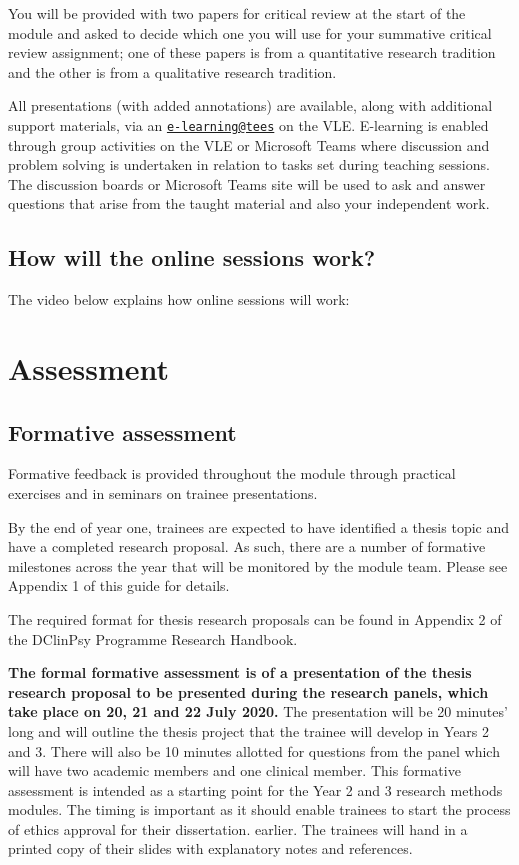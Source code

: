 \documentclass[
]{book}
\begin{document}
You will be provided with two papers for critical review at the start of the module and asked to decide which one you will use for your summative critical review assignment; one of these papers is from a quantitative research tradition and the other is from a qualitative research tradition.

All presentations (with added annotations) are available, along with additional support materials, via an \href{mailto:e-learning@tees}{\nolinkurl{e-learning@tees}} on the VLE. E-learning is enabled through group activities on the VLE or Microsoft Teams where discussion and problem solving is undertaken in relation to tasks set during teaching sessions. The discussion boards or Microsoft Teams site will be used to ask and answer questions that arise from the taught material and also your independent work.

\hypertarget{how-will-the-online-sessions-work}{%
\subsection{How will the online sessions work?}\label{how-will-the-online-sessions-work}}

The video below explains how online sessions will work:

\hypertarget{assessment}{%
\section{Assessment}\label{assessment}}

\hypertarget{formative-assessment}{%
\subsection{Formative assessment}\label{formative-assessment}}

Formative feedback is provided throughout the module through practical exercises and in seminars on trainee presentations.

By the end of year one, trainees are expected to have identified a thesis topic and have a completed research proposal. As such, there are a number of formative milestones across the year that will be monitored by the module team. Please see Appendix 1 of this guide for details.

The required format for thesis research proposals can be found in Appendix 2 of the DClinPsy
Programme Research Handbook.

\textbf{The formal formative assessment is of a presentation of the thesis research proposal to be presented during the research panels, which take place on 20, 21 and 22 July 2020.} The presentation will be 20 minutes' long and will outline the thesis project that the trainee will develop in Years 2 and 3. There will also be 10 minutes allotted for questions from the panel which will have two academic members and one clinical member. This formative assessment is intended as a starting point for the Year 2 and 3 research methods modules. The timing is important as it should enable trainees to start the process of ethics approval for their dissertation. earlier. The trainees will hand in a printed copy of their slides with explanatory notes and references.
\end{document}
